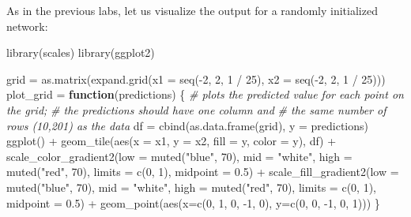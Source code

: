 \documentclass[
  a4paper,
]{article}
\newenvironment{Shaded}{\begin{snugshade}}{\end{snugshade}}
\newcommand{\AttributeTok}[1]{\textcolor[rgb]{0.77,0.63,0.00}{#1}}
\newcommand{\CommentTok}[1]{\textcolor[rgb]{0.56,0.35,0.01}{\textit{#1}}}
\newcommand{\ControlFlowTok}[1]{\textcolor[rgb]{0.13,0.29,0.53}{\textbf{#1}}}
\newcommand{\DecValTok}[1]{\textcolor[rgb]{0.00,0.00,0.81}{#1}}
\newcommand{\FloatTok}[1]{\textcolor[rgb]{0.00,0.00,0.81}{#1}}
\newcommand{\FunctionTok}[1]{\textcolor[rgb]{0.00,0.00,0.00}{#1}}
\newcommand{\NormalTok}[1]{#1}
\newcommand{\OtherTok}[1]{\textcolor[rgb]{0.56,0.35,0.01}{#1}}
\newcommand{\SpecialCharTok}[1]{\textcolor[rgb]{0.00,0.00,0.00}{#1}}
\newcommand{\StringTok}[1]{\textcolor[rgb]{0.31,0.60,0.02}{#1}}
\begin{document}
As in the previous labs, let us visualize the output for a randomly
initialized network:

\begin{Shaded}
\begin{Highlighting}[]
\FunctionTok{library}\NormalTok{(scales)}
\FunctionTok{library}\NormalTok{(ggplot2)}

\NormalTok{grid }\OtherTok{=} \FunctionTok{as.matrix}\NormalTok{(}\FunctionTok{expand.grid}\NormalTok{(}\AttributeTok{x1 =} \FunctionTok{seq}\NormalTok{(}\SpecialCharTok{{-}}\DecValTok{2}\NormalTok{, }\DecValTok{2}\NormalTok{, }\DecValTok{1} \SpecialCharTok{/} \DecValTok{25}\NormalTok{), }\AttributeTok{x2 =} \FunctionTok{seq}\NormalTok{(}\SpecialCharTok{{-}}\DecValTok{2}\NormalTok{, }\DecValTok{2}\NormalTok{, }\DecValTok{1} \SpecialCharTok{/} \DecValTok{25}\NormalTok{)))}
\NormalTok{plot\_grid }\OtherTok{=} \ControlFlowTok{function}\NormalTok{(predictions) \{}
  \CommentTok{\# plots the predicted value for each point on the grid;}
  \CommentTok{\# the predictions should have one column and}
  \CommentTok{\# the same number of rows (10,201) as the data}
\NormalTok{  df }\OtherTok{=} \FunctionTok{cbind}\NormalTok{(}\FunctionTok{as.data.frame}\NormalTok{(grid), }\AttributeTok{y =}\NormalTok{ predictions)}
  \FunctionTok{ggplot}\NormalTok{() }\SpecialCharTok{+}
    \FunctionTok{geom\_tile}\NormalTok{(}\FunctionTok{aes}\NormalTok{(}\AttributeTok{x =}\NormalTok{ x1, }\AttributeTok{y =}\NormalTok{ x2, }\AttributeTok{fill =}\NormalTok{ y, }\AttributeTok{color =}\NormalTok{ y), df) }\SpecialCharTok{+}
    \FunctionTok{scale\_color\_gradient2}\NormalTok{(}\AttributeTok{low =} \FunctionTok{muted}\NormalTok{(}\StringTok{"blue"}\NormalTok{, }\DecValTok{70}\NormalTok{), }\AttributeTok{mid =} \StringTok{"white"}\NormalTok{,}
                         \AttributeTok{high =} \FunctionTok{muted}\NormalTok{(}\StringTok{"red"}\NormalTok{, }\DecValTok{70}\NormalTok{), }\AttributeTok{limits =} \FunctionTok{c}\NormalTok{(}\DecValTok{0}\NormalTok{, }\DecValTok{1}\NormalTok{),}
                         \AttributeTok{midpoint =} \FloatTok{0.5}\NormalTok{) }\SpecialCharTok{+}
    \FunctionTok{scale\_fill\_gradient2}\NormalTok{(}\AttributeTok{low =} \FunctionTok{muted}\NormalTok{(}\StringTok{"blue"}\NormalTok{, }\DecValTok{70}\NormalTok{), }\AttributeTok{mid =} \StringTok{"white"}\NormalTok{,}
                        \AttributeTok{high =} \FunctionTok{muted}\NormalTok{(}\StringTok{"red"}\NormalTok{, }\DecValTok{70}\NormalTok{), }\AttributeTok{limits =} \FunctionTok{c}\NormalTok{(}\DecValTok{0}\NormalTok{, }\DecValTok{1}\NormalTok{),}
                        \AttributeTok{midpoint =} \FloatTok{0.5}\NormalTok{) }\SpecialCharTok{+}
    \FunctionTok{geom\_point}\NormalTok{(}\FunctionTok{aes}\NormalTok{(}\AttributeTok{x=}\FunctionTok{c}\NormalTok{(}\DecValTok{0}\NormalTok{, }\DecValTok{1}\NormalTok{, }\DecValTok{0}\NormalTok{, }\SpecialCharTok{{-}}\DecValTok{1}\NormalTok{, }\DecValTok{0}\NormalTok{), }\AttributeTok{y=}\FunctionTok{c}\NormalTok{(}\DecValTok{0}\NormalTok{, }\DecValTok{0}\NormalTok{, }\SpecialCharTok{{-}}\DecValTok{1}\NormalTok{, }\DecValTok{0}\NormalTok{, }\DecValTok{1}\NormalTok{)))}
\NormalTok{\}}


\end{Highlighting}
\end{Shaded}
\end{document}
